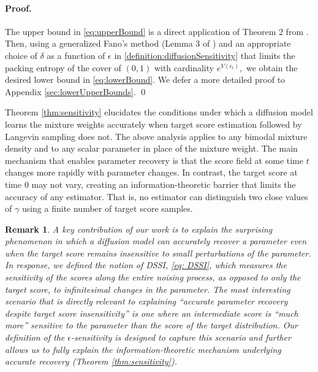 \documentclass[11pt]{article}
\theoremstyle{plain}
\newtheorem{remark}{Remark}
\newcommand{\1}{\mathbbm{1}}
\begin{document}
\paragraph{Proof.} The upper bound in \eqref{eq:upperBound} is a direct application of Theorem 2 from \citep{yangBarron}. Then, using a generalized Fano's method (Lemma 3 of \citep{binyu}) and an appropriate choice of $\delta$ as a function of $\epsilon$ in \cref{definition:diffusionSensitivity} that limits the packing entropy of the cover of $(0,1)$ with cardinality $e^{V(\epsilon_{t})},$ we obtain the desired lower bound in \eqref{eq:lowerBound}. We defer a more detailed proof to  Appendix \ref{sec:lowerUpperBounds}. \qed

Theorem \ref{thm:sensitivity} elucidates the conditions under which a diffusion model learns the mixture weights accurately when target score estimation followed by Langevin sampling does not. The above analysis 
applies to any bimodal mixture density and to any scalar parameter in place of the mixture weight. 
The main mechanism that enables parameter recovery is that the score field at some time $t$
changes more rapidly with parameter changes. In contrast, the target score at time 0 may not vary, creating an information-theoretic barrier that limits the accuracy of any
estimator. That is, no estimator can distinguish two close values of $\gamma$ using a finite number of target
score samples. 


\begin{remark}
A key contribution of our work is to explain the surprising phenomenon in which a diffusion model can accurately recover a parameter even when the target score remains insensitive to small perturbations of the parameter. In response, we defined the notion of DSSI, \eqref{eq: DSSI}, which measures the sensitivity of the scores along the entire noising process, as opposed to only the target score, to infinitesimal changes in the parameter. The most interesting scenario that is directly relevant to explaining ``accurate parameter recovery despite target score insensitivity'' is one where an intermediate score is ``much more'' sensitive to the parameter than the score of the target distribution. Our definition of the $\epsilon$-sensitivity is designed to capture this scenario and further allows us to fully explain the information-theoretic mechanism underlying accurate recovery (Theorem \ref{thm:sensitivity}). 

\end{remark}
\end{document}
